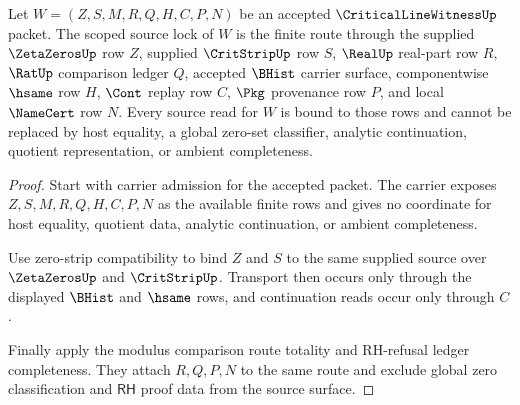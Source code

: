 \begin{theorem}
\label{thm:critical-line-witness-scoped-source-lock}
Let $W=(Z,S,M,R,Q,H,C,P,N)$ be an accepted $\CriticalLineWitnessUp$ packet. The scoped source lock of $W$ is the finite route through the supplied $\ZetaZerosUp$ row $Z$, supplied $\CritStripUp$ row $S$, $\RealUp$ real-part row $R$, $\RatUp$ comparison ledger $Q$, accepted $\BHist$ carrier surface, componentwise $\hsame$ row $H$, $\Cont$ replay row $C$, $\Pkg$ provenance row $P$, and local $\NameCert$ row $N$. Every source read for $W$ is bound to those rows and cannot be replaced by host equality, a global zero-set classifier, analytic continuation, quotient representation, or ambient completeness.
\end{theorem}
\begin{proof}
Start with carrier admission for the accepted packet. The carrier exposes $Z,S,M,R,Q,H,C,P,N$ as the available finite rows and gives no coordinate for host equality, quotient data, analytic continuation, or ambient completeness.

Use zero-strip compatibility to bind $Z$ and $S$ to the same supplied source over $\ZetaZerosUp$ and $\CritStripUp$. Transport then occurs only through the displayed $\BHist$ and $\hsame$ rows, and continuation reads occur only through $C$.

Finally apply the modulus comparison route totality and RH-refusal ledger completeness. They attach $R,Q,P,N$ to the same route and exclude global zero classification and $\mathsf{RH}$ proof data from the source surface.
\end{proof}

